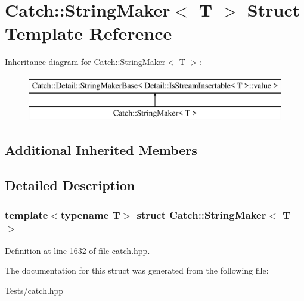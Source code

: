 \hypertarget{struct_catch_1_1_string_maker}{}\section{Catch\+:\+:String\+Maker$<$ T $>$ Struct Template Reference}
\label{struct_catch_1_1_string_maker}
Inheritance diagram for Catch\+:\+:String\+Maker$<$ T $>$\+:\begin{figure}[H]
\begin{center}
\leavevmode
\includegraphics[height=2.000000cm]{struct_catch_1_1_string_maker}
\end{center}
\end{figure}
\subsection*{Additional Inherited Members}


\subsection{Detailed Description}
\subsubsection*{template$<$typename T$>$\newline
struct Catch\+::\+String\+Maker$<$ T $>$}



Definition at line 1632 of file catch.\+hpp.



The documentation for this struct was generated from the following file\+:\begin{DoxyCompactItemize}
\item 
Tests/catch.\+hpp\end{DoxyCompactItemize}
